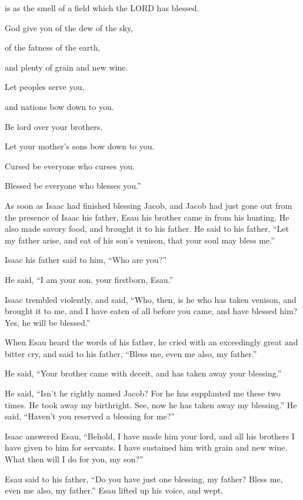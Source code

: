 is as the smell of a field which the LORD has blessed.

\myverse{}God give you of the dew of the sky,

of the fatness of the earth,

and plenty of grain and new wine.

\myverse{}Let peoples serve you,

and nations bow down to you.

Be lord over your brothers.

Let your mother’s sons bow down to you.

Cursed be everyone who curses you.

Blessed be everyone who blesses you.”

\myverse{}As soon as Isaac had finished blessing Jacob, and Jacob had just gone out from the presence of Isaac his father, Esau his brother came in from his hunting. \myverse{}He also made savory food, and brought it to his father. He said to his father, “Let my father arise, and eat of his son’s venison, that your soul may bless me.”

\myverse{}Isaac his father said to him, “Who are you?”

He said, “I am your son, your firstborn, Esau.”

\myverse{}Isaac trembled violently, and said, “Who, then, is he who has taken venison, and brought it to me, and I have eaten of all before you came, and have blessed him? Yes, he will be blessed.”

\myverse{}When Esau heard the words of his father, he cried with an exceedingly great and bitter cry, and said to his father, “Bless me, even me also, my father.”

\myverse{}He said, “Your brother came with deceit, and has taken away your blessing.”

\myverse{}He said, “Isn’t he rightly named Jacob? For he has supplanted me these two times. He took away my birthright. See, now he has taken away my blessing.” He said, “Haven’t you reserved a blessing for me?”

\myverse{}Isaac answered Esau, “Behold, I have made him your lord, and all his brothers I have given to him for servants. I have sustained him with grain and new wine. What then will I do for you, my son?”

\myverse{}Esau said to his father, “Do you have just one blessing, my father? Bless me, even me also, my father.” Esau lifted up his voice, and wept.

